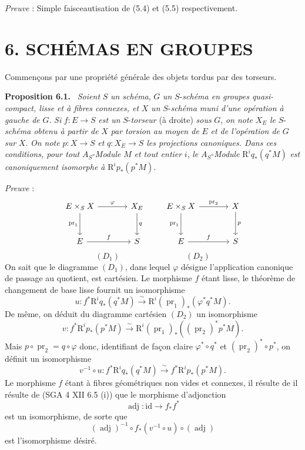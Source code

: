 \documentclass[11pt]{article}
\newenvironment{statement}[1]{\par\medskip\noindent\textbf{#1.}\ }{\par\medskip}
\providecommand{\pr}{\operatorname{pr}}
\providecommand{\pr}{\operatorname{pr}}
\begin{document}
\emph{Preuve} : Simple faisceautisation de (5.4) et (5.5) respectivement.

\section*{6. SCHÉMAS EN GROUPES}

Commençons par une propriété générale des objets tordus par des torseurs.

\begin{statement}{Proposition 6.1}
\emph{Soient} $S$ \emph{un schéma}, $G$ \emph{un} $S$-\emph{schéma en groupes quasi-compact, lisse et à fibres connexes, et} $X$ \emph{un} $S$-\emph{schéma muni d'une opération à gauche de} $G$. \emph{Si} $f:E\to S$ \emph{est un} $S$-\emph{torseur} (à droite) \emph{sous} $G$, \emph{on note} $X_E$ \emph{le} $S$-\emph{schéma obtenu à partir de} $X$ \emph{par torsion au moyen de} $E$ \emph{et de l'opération de} $G$ \emph{sur} $X$. \emph{On note} $p:X\to S$ \emph{et} $q:X_E\to S$ \emph{les projections canoniques. Dans ces conditions, pour tout} $A_S$-\emph{Module} $M$ \emph{et tout entier} $i$, \emph{le} $A_S$-\emph{Module} $\mathrm{R}^iq_*(q^*M)$ \emph{est canoniquement isomorphe à} $\mathrm{R}^ip_*(p^*M)$.
\end{statement}

\emph{Preuve} :
\[
\begin{tikzcd}[column sep=large,row sep=large]
E\times_S X \arrow[r,"\varphi"] \arrow[d,"\pr_1"'] & X_E \arrow[d,"q"]\\
E \arrow[r,"f"] & S
\end{tikzcd}
\qquad
\begin{tikzcd}[column sep=large,row sep=large]
E\times_S X \arrow[r,"\pr_2"] \arrow[d,"\pr_1"'] & X \arrow[d,"p"]\\
E \arrow[r,"f"] & S
\end{tikzcd}
\]
\[
(D_1)\qquad\qquad\qquad\qquad(D_2)
\]
On sait que le diagramme $(D_1)$, dans lequel $\varphi$ désigne l'application canonique de passage au quotient, est cartésien. Le morphisme $f$ étant lisse, le théorème de changement de base lisse fournit un isomorphisme
\[
u:f^*\mathrm{R}^iq_*(q^*M)\xrightarrow{\sim}\mathrm{R}^i(\pr_1)_*(\varphi^*q^*M).
\]
De même, on déduit du diagramme cartésien $(D_2)$ un isomorphisme
\[
v:f^*\mathrm{R}^ip_*(p^*M)\xrightarrow{\sim}\mathrm{R}^i(\pr_1)_*((\pr_2)^*p^*M).
\]
Mais $p\circ\pr_2=q\circ\varphi$ donc, identifiant de façon claire $\varphi^*\circ q^*$ et $(\pr_2)^*\circ p^*$, on définit un isomorphisme
\[
v^{-1}\circ u:f^*\mathrm{R}^iq_*(q^*M)\xrightarrow{\sim} f^*\mathrm{R}^ip_*(p^*M).
\]
Le morphisme $f$ étant à fibres géométriques non vides et connexes, il
résulte de 
il résulte de (SGA 4 XII 6.5 (i)) que le morphisme d'adjonction
\[
\operatorname{adj}:\mathrm{id}\to f_*f^*
\]
est un isomorphisme, de sorte que
\[
(\operatorname{adj})^{-1}\circ f_*(v^{-1}\circ u)\circ(\operatorname{adj})
\]
est l'isomorphisme désiré.
\end{document}
